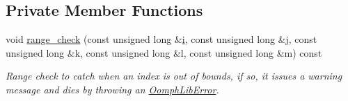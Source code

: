 \subsection*{Private Member Functions}
\begin{DoxyCompactItemize}
\item 
void \hyperlink{classoomph_1_1RankFiveTensor_a8fce9375f99c153e3d5b91193996dad8}{range\+\_\+check} (const unsigned long \&\hyperlink{cfortran_8h_adb50e893b86b3e55e751a42eab3cba82}{i}, const unsigned long \&j, const unsigned long \&k, const unsigned long \&l, const unsigned long \&m) const
\begin{DoxyCompactList}\small\item\em Range check to catch when an index is out of bounds, if so, it issues a warning message and dies by throwing an {\ttfamily \hyperlink{classoomph_1_1OomphLibError}{Oomph\+Lib\+Error}}. \end{DoxyCompactList}\end{DoxyCompactItemize}
